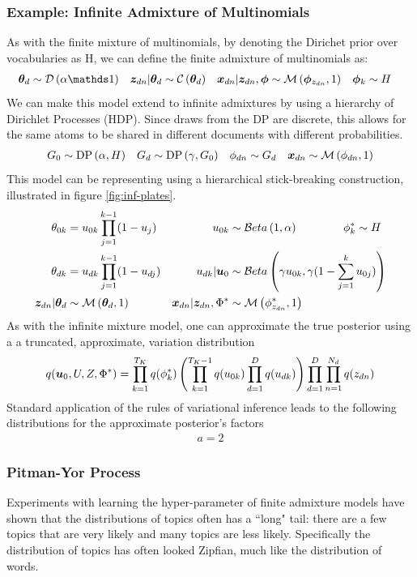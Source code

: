 \subsubsection*{Example: Infinite Admixture of Multinomials}
As with the finite mixture of multinomials, by denoting the Dirichet prior over vocabularies as H, we can define the finite admixture of multinomials as:
\begin{align}
\thd & \sim \dir{\alpha \one} &
\zdn|\thd & \sim \cat{\thd} & 
\xdn|\zdn, \param & \sim \muln{\param_{z_{dn}}}{1} & 
\param_k & \sim H
\end{align}
We can make this model extend to infinite admixtures by using a hierarchy of Dirichlet Processes (HDP)\cite{Teh2006b}. Since draws from the DP are discrete, this allows for the same atoms to be shared in different documents with different probabilities.
\begin{align}
G_0 & \sim \text{DP} \left( {\alpha, H} \right) &
G_d & \sim \text{DP} \left( {\gamma, G_0} \right) &
\phi_{dn} &\sim G_d &
{ \bm x_{dn} } \sim \mathcal{M} \left( {\phi_{dn}},{1} \right)
\end{align}
This model can be representing using a hierarchical stick-breaking construction, illustrated in figure \ref{fig:inf-plates}.
\begin{align}
\theta_{0k} & = u_{0k} \prod_{j=1}^{k-1}(1-u_j) &
u_{0k} & \sim \mathcal{B}eta \left( {1}, {\alpha} \right) \qquad\qquad
\phi^*_k \sim H \\
\theta_{dk} &= u_{dk} \prod_{j=1}^{k-1}(1 - u_{dj}) &
u_{dk}|\bm u_{0} & \sim \mathcal{B}eta \left( {\gamma u_{0k}}, {\gamma ( 1 - \sum_{j=1}^{k} u_{0j} )} \right) \\
{ \bm z_{dn} } | { \bm \theta_d } & \sim \mathcal{M} \left( {{ \bm \theta_d }},{1} \right) &
{ \bm x_{dn} } | { \bm z_{dn} }, \Phi^* &\sim \mathcal{M} \left( {\phi^*_{z_{dn}}},{1} \right)
\end{align}
As with the infinite mixture model, one can approximate the true posterior using a a truncated, approximate, variation distribution
\begin{equation}
q(\bm u_0, U, Z, \Phi^*) = \prod_{k=1}^{T_K} q(\phi^*_k) \left( \prod_{k=1}^{T_K-1} q(u_{0k}) \prod_{d=1}^D q(u_{dk})\right) \prod_{d=1}^{D}\prod_{n=1}^{N_d} q(z_{dn})
\end{equation}
Standard application of the rules of variational inference leads to the following distributions for the approximate posterior's factors
\begin{align}
a = 2
\end{align}

\subsubsection{Pitman-Yor Process}
Experiments with learning the hyper-parameter of finite admixture models have shown that the distributions of topics often has a ``long" tail: there are a few topics that are very likely and many topics are less likely\cite{Wallach2009a}. Specifically the distribution of topics has often looked Zipfian, much like the distribution of words.

